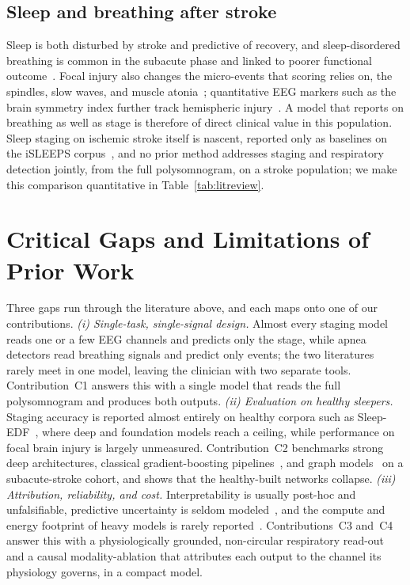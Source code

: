 \documentclass[preprint,12pt]{elsarticle}
\begin{document}
\subsection{Sleep and breathing after stroke}
Sleep is both disturbed by stroke and predictive of recovery, and sleep-disordered breathing
is common in the subacute phase and linked to poorer functional
outcome~\cite{bassetti2006sleep,denis2024sleep,tellenbach2023brainstem}. Focal injury also changes
the micro-events that scoring relies on, the spindles, slow waves, and muscle
atonia~\cite{gottselig2002stroke,fernandez2019spindles,simpson2023laterality,facchin2020slowwaves,zheng2025spindles};
quantitative EEG markers such as the brain symmetry index further track hemispheric
injury~\cite{anastasi2017bsi}. A model that reports on breathing as well as stage is therefore of
direct clinical value in this population. Sleep staging on ischemic stroke itself is nascent, reported only as baselines on
the iSLEEPS corpus~\cite{maiti2026isleeps}, and no prior method addresses staging and respiratory
detection jointly, from the full polysomnogram, on a stroke population; we make this comparison
quantitative in Table~\ref{tab:litreview}.

\section{Critical Gaps and Limitations of Prior Work}
\label{sec:gaps}
Three gaps run through the literature above, and each maps onto one of our contributions.
\emph{(i) Single-task, single-signal design.} Almost every staging model reads one or a few EEG
channels and predicts only the stage, while apnea detectors read breathing signals and predict
only events; the two literatures rarely meet in one model, leaving the clinician with two
separate tools. Contribution~C1 answers this with a single model that reads the full
polysomnogram and produces both outputs.
\emph{(ii) Evaluation on healthy sleepers.} Staging accuracy is reported almost entirely on
healthy corpora such as Sleep-EDF~\cite{kemp2000sleepedf,goldberger2000physionet}, where deep
and foundation models reach a ceiling, while performance on focal brain injury is largely
unmeasured. Contribution~C2 benchmarks strong deep architectures, classical gradient-boosting
pipelines~\cite{chen2016xgboost,ke2017lightgbm,prokhorenkova2018catboost}, and graph
models~\cite{velickovic2018gat} on a subacute-stroke cohort, and shows that the healthy-built
networks collapse.
\emph{(iii) Attribution, reliability, and cost.} Interpretability is usually post-hoc and
unfalsifiable, predictive uncertainty is seldom modeled~\cite{angelopoulos2023conformal}, and the
compute and energy footprint of heavy models is rarely reported~\cite{lacoste2019carbon}.
Contributions~C3 and~C4 answer this with a physiologically grounded, non-circular respiratory
read-out and a causal modality-ablation that attributes each output to the channel its physiology
governs, in a compact model.
\end{document}
